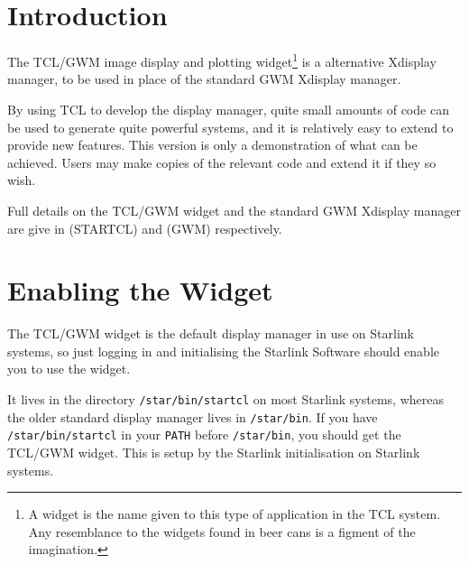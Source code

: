 \stardocabstract
 \newpage
 \begin{latexonly}
   \setlength{\parskip}{0mm}
   \latexonlytoc
   \setlength{\parskip}{\medskipamount}
   \markboth{\stardocname}{\stardocname}
 \end{latexonly}
\cleardoublepage
\renewcommand{\thepage}{\arabic{page}}
\setcounter{page}{1}

\section{\label{introduction}Introduction}

The TCL/GWM image display and plotting widget\footnote{A widget is the 
name given to this type of application in the TCL system.  Any resemblance
to the widgets found in beer cans is a figment of the imagination.} is a 
alternative Xdisplay manager, to be used in place of the standard
GWM Xdisplay manager.

By using TCL to develop the display manager, quite small amounts of code 
can be used to generate quite powerful systems, and it is relatively easy 
to extend to provide new features.  This version is only a demonstration of 
what can be achieved.  Users may make copies of the relevant code and 
extend it if they so wish.

Full details on the TCL/GWM widget and the standard GWM Xdisplay
manager are give in  (STARTCL) and
 (GWM) respectively.

\section{\label{enabling_the_widget}Enabling the Widget}

The TCL/GWM widget is the default display manager in use on Starlink
systems, so just logging in and initialising the Starlink Software should
enable you to use the widget.

It lives in the directory {\tt{/star/bin/startcl}} on most Starlink systems,
whereas the older standard display manager lives in {\tt{/star/bin}}.  If you
have {\tt{/star/bin/startcl}} in your {\tt{PATH}} before {\tt{/star/bin}},
you should get the TCL/GWM widget.  This is setup by the Starlink
initialisation on Starlink systems.

